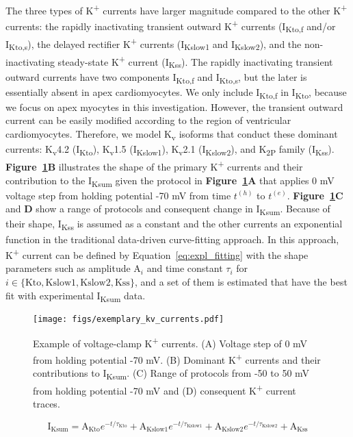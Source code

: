 \documentclass[11pt]{article}
\begin{document}
The three types of K\textsuperscript{+} currents have larger magnitude compared to the other K\textsuperscript{+} currents: the rapidly inactivating transient outward K\textsuperscript{+} currents (I\textsubscript{Kto,f} and/or I\textsubscript{Kto,s}), the delayed rectifier K\textsuperscript{+} currents (I\textsubscript{Kslow1} and I\textsubscript{Kslow2}), and the non-inactivating steady-state K\textsuperscript{+} current (I\textsubscript{Kss}). The rapidly inactivating transient outward currents have two components I\textsubscript{Kto,f} and I\textsubscript{Kto,s}, but the later is essentially absent in apex cardiomyocytes. We only include I\textsubscript{Kto,f} in I\textsubscript{Kto}, because we focus on apex myocytes in this investigation. However, the transient outward current can be easily modified according to the region of ventricular cardiomyocytes. Therefore, we model K\textsubscript{v} isoforms that conduct these dominant currents: K\textsubscript{v}4.2 (I\textsubscript{Kto}), K\textsubscript{v}1.5 (I\textsubscript{Kslow1}), K\textsubscript{v}2.1 (I\textsubscript{Kslow2}), and K\textsubscript{2P} family (I\textsubscript{Kss}). \textbf{Figure~\ref{fig:kcurrent_example}B} illustrates the shape of the primary K\textsuperscript{+} currents and their contribution to the I\textsubscript{Ksum} given the protocol in \textbf{Figure~\ref{fig:kcurrent_example}A} that applies 0 mV voltage step from holding potential -70 mV from time $t^{(h)}$ to $t^{(e)}$. \textbf{Figure~\ref{fig:kcurrent_example}C} and \textbf{D} show a range of protocols and consequent change in I\textsubscript{Ksum}. Because of their shape, I\textsubscript{Kss} is assumed as a constant and the other currents an exponential function in the traditional data-driven curve-fitting approach. In this approach, K\textsuperscript{+} current can be defined by Equation~\ref{eq:expl_fitting} with the shape parameters such as amplitude $\mathrm{A}_{i}$ and time constant $\tau_{i}$ for $i \in \{\mathrm{Kto}, \mathrm{Kslow1}, \mathrm{Kslow2}, \mathrm{Kss}\}$, and a set of them is estimated that have the best fit with experimental I\textsubscript{Ksum} data.
\begin{figure}[!ht]
    \centering
    \texttt{[image: figs/exemplary\_kv\_currents.pdf]}
    \caption{Example of voltage-clamp K\textsuperscript{+} currents. (A) Voltage step of 0 mV from holding potential -70 mV. (B) Dominant K\textsuperscript{+} currents and their contributions to I\textsubscript{Ksum}. (C) Range of protocols from -50 to 50 mV from holding potential -70 mV and (D) consequent K\textsuperscript{+} current traces.}
    \label{fig:kcurrent_example}
\end{figure}
\begin{equation}
    \label{eq:expl_fitting}
    \mathrm{I}_{\mathrm{Ksum}} = \mathrm{A}_{\mathrm{Kto}}e^{-t/\tau_{\mathrm{Kto}}} + \mathrm{A}_{\mathrm{Kslow1}}e^{-t/\tau_{\mathrm{Kslow1}}} + \mathrm{A}_{\mathrm{Kslow2}}e^{-t/\tau_{\mathrm{Kslow2}}} +  \mathrm{A}_{\mathrm{Kss}}
\end{equation}
\end{document}
